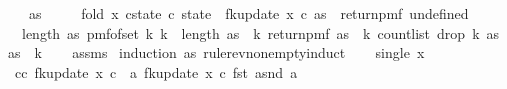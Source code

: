\begin{isabellebody}
\ \ \ {\isachardoublequoteopen}as\ {\isasymnoteq}\ {\isacharbrackleft}{\kern0pt}{\isacharbrackright}{\kern0pt}{\isachardoublequoteclose}\isanewline
\ \ \ {\isachardoublequoteopen}fold\ {\isacharparenleft}{\kern0pt}{\isasymlambda}x\ {\isacharparenleft}{\kern0pt}c{\isacharcomma}{\kern0pt}state{\isacharparenright}{\kern0pt}{\isachardot}{\kern0pt}\ {\isacharparenleft}{\kern0pt}c{\isacharplus}{\kern0pt}{}{\isacharcomma}{\kern0pt}\ state\ {\isasymbind}\ fk{\isacharunderscore}{\kern0pt}update{\isacharprime}{\kern0pt}{\isacharprime}{\kern0pt}\ x\ c{\isacharparenright}{\kern0pt}{\isacharparenright}{\kern0pt}\ as\ {\isacharparenleft}{\kern0pt}{}{\isacharcomma}{\kern0pt}\ return{\isacharunderscore}{\kern0pt}pmf\ undefined{\isacharparenright}{\kern0pt}\ {\isacharequal}{\kern0pt}\isanewline
\ \ {\isacharparenleft}{\kern0pt}length\ as{\isacharcomma}{\kern0pt}\ pmf{\isacharunderscore}{\kern0pt}of{\isacharunderscore}{\kern0pt}set\ {\isacharbraceleft}{\kern0pt}k{\isachardot}{\kern0pt}\ k\ {\isacharless}{\kern0pt}\ length\ as{\isacharbraceright}{\kern0pt}\ {\isasymbind}\ {\isacharparenleft}{\kern0pt}{\isasymlambda}k{\isachardot}{\kern0pt}\ return{\isacharunderscore}{\kern0pt}pmf\ {\isacharparenleft}{\kern0pt}as\ {\isacharbang}{\kern0pt}\ k{\isacharcomma}{\kern0pt}\ count{\isacharunderscore}{\kern0pt}list\ {\isacharparenleft}{\kern0pt}drop\ {\isacharparenleft}{\kern0pt}k{\isacharplus}{\kern0pt}{}{\isacharparenright}{\kern0pt}\ as{\isacharparenright}{\kern0pt}\ {\isacharparenleft}{\kern0pt}as\ {\isacharbang}{\kern0pt}\ k{\isacharparenright}{\kern0pt}{\isacharparenright}{\kern0pt}{\isacharparenright}{\kern0pt}{\isacharparenright}{\kern0pt}{\isachardoublequoteclose}\isanewline
%
\isadelimproof
\ \ %
\endisadelimproof
%
\isatagproof
{}\isamarkupfalse%
\ assms\isanewline
{}\isamarkupfalse%
\ {\isacharparenleft}{\kern0pt}induction\ as\ rule{\isacharcolon}{\kern0pt}rev{\isacharunderscore}{\kern0pt}nonempty{\isacharunderscore}{\kern0pt}induct{\isacharparenright}{\kern0pt}\isanewline
\ \ \isamarkupfalse%
\ {\isacharparenleft}{\kern0pt}single\ x{\isacharparenright}{\kern0pt}\isanewline
\ \ \isamarkupfalse%
\ c{\isacharcolon}{\kern0pt}{\isachardoublequoteopen}{\isasymAnd}c{\isachardot}{\kern0pt}\ fk{\isacharunderscore}{\kern0pt}update{\isacharprime}{\kern0pt}{\isacharprime}{\kern0pt}\ x\ c\ {\isacharequal}{\kern0pt}\ {\isacharparenleft}{\kern0pt}{\isasymlambda}a{\isachardot}{\kern0pt}\ fk{\isacharunderscore}{\kern0pt}update{\isacharprime}{\kern0pt}{\isacharprime}{\kern0pt}\ x\ c\ {\isacharparenleft}{\kern0pt}fst\ a{\isacharcomma}{\kern0pt}snd\ a{\isacharparenright}{\kern0pt}{\isacharparenright}{\kern0pt}{\isachardoublequoteclose}\ \isanewline

\end{isabellebody}
